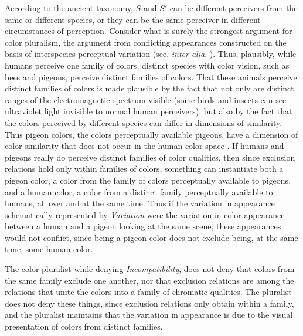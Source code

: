 \documentclass[12pt]{article}
\begin{document}
According to the ancient taxonomy, \( S \) and \( S' \) can be different perceivers from the same or different species, or they can be the same perceiver in different circumstances of perception. Consider what is surely the strongest argument for color pluralism, the argument from conflicting appearances constructed on the basis of interspecies perceptual variation (see, \emph{inter alia}, \citealt{Bradley:2001mi,Byrne:2003we,Mizrahi:2006zr,Allen:2005be}). Thus, plausibly, while humans perceive one family of colors, distinct species with color vision, such as bees and pigeons, perceive distinct families of colors. That these animals perceive distinct families of colors is made plausible by the fact that not only are distinct ranges of the electromagnetic spectrum visible (some birds and insects can see ultraviolet light invisible to normal human perceivers), but also by the fact that the colors perceived by different species can differ in dimensions of similarity. Thus pigeon colors, the colors perceptually available pigeons, have a dimension of color similarity that does not occur in the human color space \citep{Allen:2005be}. If humans and pigeons really do perceive distinct families of color qualities, then since exclusion relations hold only within families of colors, something can instantiate both a pigeon color, a color from the family of colors perceptually available to pigeons, and a human color, a color from a distinct family perceptually available to humans, all over and at the same time. Thus if the variation in appearance schematically represented by \emph{Variation} were the variation in color appearance between a human and a pigeon looking at the same scene, these appearances would not conflict, since being a pigeon color does not exclude being, at the same time, some human color.

The color pluralist while denying \emph{Incompatibility}, does not deny that colors from the same family exclude one another, nor that exclusion relations are among the relations that unite the colors into a family of chromatic qualities. The pluralist does not deny these things, since exclusion relations only obtain within a family, and the pluralist maintains that the variation in appearance is due to the visual presentation of colors from distinct families.
\end{document}
